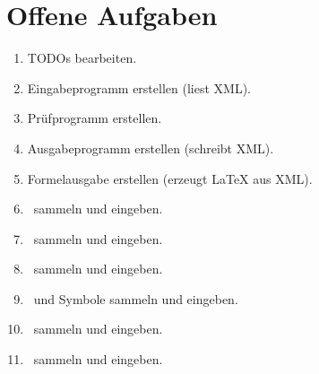 \section     {Offene Aufgaben}%
\label   {sec:OffeneAufgaben}

\begin{enumerate}
	\item TODOs bearbeiten.
	\item Eingabeprogramm erstellen (liest XML).
	\item Prüfprogramm erstellen.
	\item Ausgabeprogramm erstellen (schreibt XML).
	\item Formelausgabe erstellen (erzeugt \LaTeX{} aus XML).
	\item \Axiome\ sammeln und eingeben.
	\item \Saetze\ sammeln und eingeben.
	\item \Beweise\ sammeln und eingeben.
	\item \Fachbegriffe\ und Symbole sammeln und eingeben.
	\item \Fachgebiete\ sammeln und eingeben.
	\item \Ausgabeschemata\ sammeln und eingeben.
\end{enumerate}

\Endchapter
